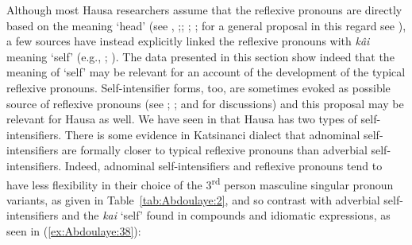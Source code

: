 \documentclass[output=paper]{langscibook}
\begin{document}
Although most Hausa researchers assume that the reflexive pronouns are directly based on the meaning ‘head’ (see \citealt[74]{Caron1991},
;\citealt[529]{Newman2000}; \citealt[413]{Jaggar2001}; \citealt[147f]{Pawlak2014}; for a general proposal in this regard see \citealt[32f,109f]{Faltz1985}), a few sources have instead explicitly linked the reflexive pronouns with \textit{kâi} meaning ‘self’ (e.g., \citealt[117]{Wolff1993}; \citealt[161]{Will2019}). The data presented in this section show indeed that the meaning of ‘self’ may be relevant for an account of the development of the typical reflexive pronouns. Self-intensifier forms, too, are sometimes evoked as possible source of reflexive pronouns (see \citealt[44]{KoenigSiemund2000}; \citealt[105f]{Schladt2000}; and \citealt[22]{Haspelmath2020a} for discussions) and this proposal may be relevant for Hausa as well. We have seen in  that Hausa has two types of self-intensifiers. There is some evidence in Katsinanci dialect that adnominal self-intensifiers are formally closer to typical reflexive pronouns than adverbial self-intensifiers. Indeed, adnominal self-intensifiers and reflexive pronouns tend to have less flexibility in their choice of the 3\textsuperscript{rd} person masculine singular pronoun variants, as given in Table~\ref{tab:Abdoulaye:2}, and so contrast with adverbial self-intensifiers and the \textit{kai} ‘self’ found in compounds and idiomatic expressions, as seen in (\ref{ex:Abdoulaye:38}):
\end{document}
